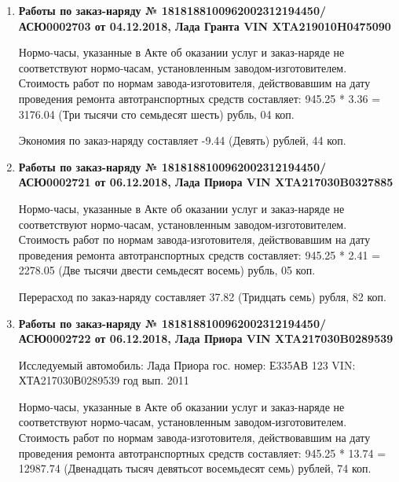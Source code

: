 \begin{enumerate}


\item \par\textbf{{Работы по заказ-наряду     № 1818188100962002312194450/\-АСЮ0002703 от 04.12.2018, Лада Гранта   VIN  XTA219010H0475090
}}



Нормо-часы, указанные в Акте об оказании услуг и заказ-наряде не соответствуют нормо-часам,  установленным заводом-изготовителем.\\
Стоимость работ по нормам завода-изготовителя, действовавшим на дату проведения ремонта автотранспортных средств составляет: 945.25 * 3.36  = 3176.04 (Три тысячи сто семьдесят шесть) рубль, 04 коп.

Экономия  по заказ-наряду составляет -9.44 (Девять) рублей, 44 коп.  
\vspace{3mm}






\item \par\textbf{{Работы по заказ-наряду     № 1818188100962002312194450/\-АСЮ0002721 от 06.12.2018, Лада Приора  VIN   XTA217030B0327885
}}



Нормо-часы, указанные в Акте об оказании услуг и заказ-наряде не соответствуют нормо-часам,  установленным заводом-изготовителем.\\
Стоимость работ по нормам завода-изготовителя, действовавшим на дату проведения ремонта автотранспортных средств составляет: 945.25 * 2.41  = 2278.05 (Две тысячи двести семьдесят восемь) рубль, 05 коп.

Перерасход  по заказ-наряду составляет 37.82 (Тридцать семь) рубля, 82 коп.  
\vspace{3mm}




\item \par\textbf{{Работы по заказ-наряду     № 1818188100962002312194450/\-АСЮ0002722 от 06.12.2018, Лада Приора  VIN  XTA217030B0289539
}}

Исследуемый автомобиль:  Лада Приора гос. номер: Е335АВ 123 VIN: ХТА217030В0289539 год вып. 2011




Нормо-часы, указанные в Акте об оказании услуг и заказ-наряде не соответствуют нормо-часам,  установленным заводом-изготовителем.\\
Стоимость работ по нормам завода-изготовителя, действовавшим на дату проведения ремонта автотранспортных средств составляет: 945.25 * 13.74  = 12987.74 (Двенадцать тысяч девятьсот восемьдесят семь) рублей, 74 коп.


\end{enumerate}
